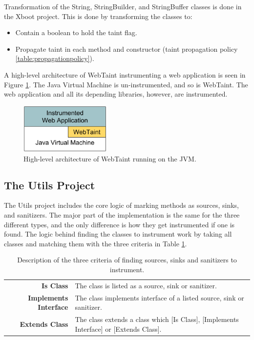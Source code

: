 Transformation of the String, StringBuilder, and StringBuffer classes is done in the Xboot project. This is done by transforming the classes to: 

\hfill
\begin{itemize}
    \item Contain a boolean to hold the taint flag.
    \item Propagate taint in each method and constructor (taint propagation policy \ref{table:propagationpolicy}).
\end{itemize}
\hfill

A high-level architecture of WebTaint instrumenting a web application is seen in Figure \ref{fig:WebTaint}. The Java Virtual Machine is un-instrumented, and so is WebTaint. The web application and all its depending libraries, however, are instrumented.

\begin{figure}[H]
    \centering
    \includegraphics[width=0.4\textwidth]{images/WebTaintArchitecture.png}
    \caption{High-level architecture of WebTaint running on the JVM.}
    \label{fig:WebTaint}
\end{figure}



\subsection{The Utils Project}
The Utils project includes the core logic of marking methods as sources, sinks, and sanitizers. The major part of the implementation is the same for the three different types, and the only difference is how they get instrumented if one is found. The logic behind finding the classes to instrument work by taking all classes and matching them with the three criteria in Table \ref{table:criterias}.

\begin{table}[H]
    \centering
    \caption{Description of the three criteria of finding sources, sinks and sanitizers to instrument.}
    \label{table:criterias}
    \begin{tabular}{rp{8cm}}
        \textbf{Is Class} & The class is listed as a source, sink or sanitizer. \\
        \textbf{Implements Interface} & The class implements interface of a listed source, sink or sanitizer. \\
        \textbf{Extends Class} & The class extends a class which [Is Class], [Implements Interface] or [Extends Class]. \\
    \end{tabular}
\end{table}

